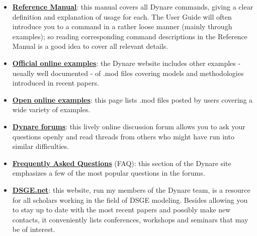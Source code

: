 \begin{itemize}
\item \href{http://www.cepremap.cnrs.fr/juillard/mambo/download/manual/index.html}{\textbf{Reference Manual}}: this manual covers all Dynare commands, giving a clear definition and explanation of usage for each. The User Guide will often introduce you to a command in a rather loose manner (mainly through examples); so reading corresponding command descriptions in the Reference Manual is a good idea to cover all relevant details. 
\item \href{http://www.cepremap.cnrs.fr/juillard/mambo/index.php?option=com_content&task=category&sectionid=11&id=96&Itemid=89}{\textbf{Official online examples}}: the Dynare website includes other examples - usually well documented - of .mod files covering models and methodologies introduced in recent papers. 
\item \href{http://www.cepremap.cnrs.fr/juillard/mambo/index.php?option=com_forum&Itemid=95&page=viewforum&f=2&sid=10290a11eb7a48243971159f5b86f83e}{\textbf{Open online examples}}: this page lists .mod files posted by users covering a wide variety of examples. 
\item \href{http://www.dynare.org/phpBB3}{\textbf{Dynare forums}}: this lively online discussion forum allows you to ask your questions openly and read threads from others who might have run into similar difficulties. 
\item \href{http://www.cepremap.cnrs.fr/juillard/mambo/index.php?option=com_content&task=section&id=3&Itemid=40}{\textbf{Frequently Asked Questions}} (FAQ): this section of the Dynare site emphasizes a few of the most popular questions in the forums. 
\item \href{http://www.dsge.net}{\textbf{DSGE.net}}: this website, run my members of the Dynare team, is a resource for all scholars working in the field of DSGE modeling. Besides allowing you to stay up to date with the most recent papers and possibly make new contacts, it conveniently lists conferences, workshops and seminars that may be of interest. 
\end{itemize}

